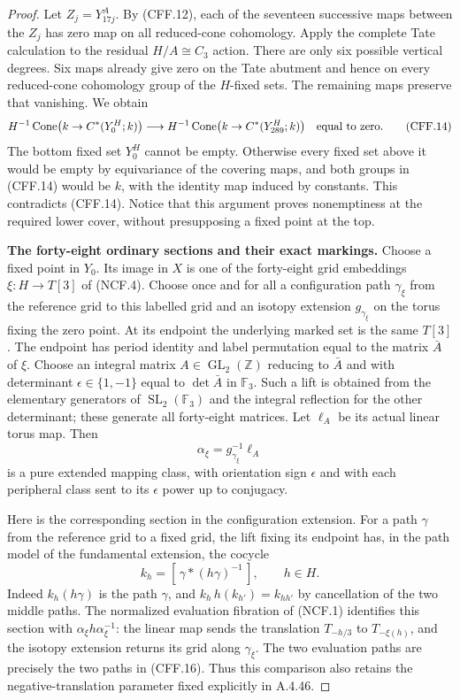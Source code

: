 \begin{proof}
Let $Z_j=Y_{17j}^A$.  By (CFF.12), each of the seventeen successive
maps between the $Z_j$ has zero map on all reduced-cone
cohomology.  Apply the complete Tate calculation to the residual
$H/A\cong C_3$ action.  There are only six possible vertical
degrees.  Six maps already give zero on the Tate abutment and
hence on every reduced-cone cohomology group of the $H$-fixed
sets.  The remaining maps preserve that vanishing.  We obtain
\[
 H^{-1}\operatorname{Cone}\bigl(k\to C^*(Y_0^H;k)\bigr)
       \longrightarrow
 H^{-1}\operatorname{Cone}\bigl(k\to C^*(Y_{289}^H;k)\bigr)
                         \quad\hbox{equal to zero}.             \tag{CFF.14}
\]
The bottom fixed set $Y_0^H$ cannot be empty.  Otherwise every
fixed set above it would be empty by equivariance of the covering
maps, and both groups in (CFF.14) would be $k$, with the identity
map induced by constants.  This contradicts (CFF.14).
Notice that this argument proves nonemptiness at the required
lower cover, without presupposing a fixed point at the top.

\par\medskip\noindent\textbf{The forty-eight ordinary sections and their exact markings.}\quad
Choose a fixed point in $Y_0$.  Its image in $X$ is one of the
forty-eight grid embeddings $\xi:H\to T[3]$ of (NCF.4).
Choose once and for all a configuration path $\gamma_\xi$ from
the reference grid to this labelled grid and an isotopy extension
$g_{\gamma_\xi}$ on the torus fixing the zero point.
At its endpoint the underlying marked set is the same $T[3]$.
The endpoint has period identity and label permutation equal to
the matrix $\bar A$ of $\xi$.
Choose an integral matrix $A\in\operatorname{GL}_2(\mathbb Z)$
reducing to $\bar A$ and with determinant
$\epsilon\in\{1,-1\}$ equal to $\det\bar A$ in $\mathbb F_3$.
Such a lift is obtained from the elementary generators of
$\operatorname{SL}_2(\mathbb F_3)$ and the integral reflection
for the other determinant; these generate all forty-eight
matrices.  Let $\ell_A$ be its actual linear torus map.  Then
\[
 \alpha_\xi=g_{\gamma_\xi}^{-1}\ell_A
                                                               \tag{CFF.15}
\]
is a pure extended mapping class, with orientation sign
$\epsilon$ and with each peripheral class sent to its
$\epsilon$ power up to conjugacy.

Here is the corresponding section in the configuration extension.
For a path $\gamma$ from the reference grid to a fixed grid,
the lift fixing its endpoint has, in the path model of the
fundamental extension, the cocycle
\[
        k_h=[\,\gamma*(h\gamma)^{-1}\,],\qquad h\in H.
                                                               \tag{CFF.16}
\]
Indeed $k_h(h\gamma)$ is the path $\gamma$, and
$k_h\,h(k_{h'})=k_{hh'}$ by cancellation of the two middle paths.
The normalized evaluation fibration of (NCF.1) identifies this
section with
$\alpha_\xi h\alpha_\xi^{-1}$: the linear map sends the
translation $T_{-h/3}$ to $T_{-\xi(h)}$, and the isotopy extension
returns its grid along $\gamma_\xi$.  The two evaluation paths
are precisely the two paths in (CFF.16).  Thus this comparison
also retains the negative-translation parameter fixed explicitly
in A.4.46.


\end{proof}
